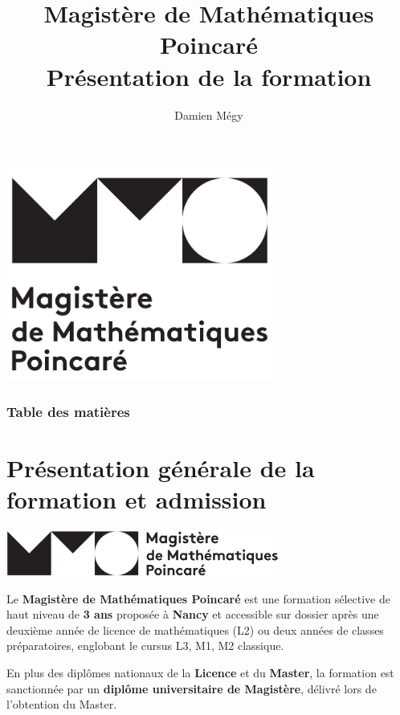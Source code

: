\documentclass[slidetop,11pt]{beamer}
\title{Magistère de Mathématiques Poincaré\\ Présentation de la formation}
\author{Damien Mégy}
\begin{document}
  

\begin{frame}
\begin{center}
\includegraphics[height=7cm]{images/Logo-MMP-noir-cropped}
\end{center}
\end{frame}  

\begin{frame}
\frametitle{Table des matières}
\tableofcontents
\end{frame}

\section{Présentation générale de la formation et admission}

\begin{frame}
\begin{center}
\includegraphics[height=1.5cm]{images/Logo-MMP-noir-2}
\end{center}
Le \textbf{Magistère de Mathématiques Poincaré} est une formation sélective de haut niveau de \textbf{3 ans} proposée à \textbf{Nancy} et accessible sur dossier après une deuxième année de licence de mathématiques (L2) ou deux années de classes préparatoires, englobant le cursus L3, M1, M2 classique.
\bigskip

En plus des diplômes nationaux de la \textbf{Licence} et du \textbf{Master}, la formation est sanctionnée par un \textbf{diplôme universitaire de Magistère}, délivré lors de l'obtention du Master.
\end{frame}
\end{document}
